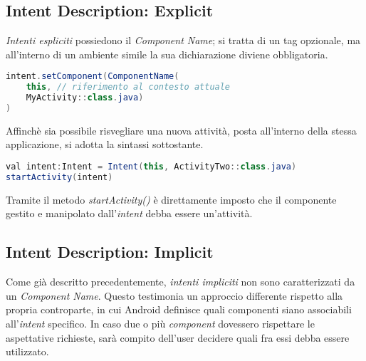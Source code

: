 \documentclass{article}
\begin{document}
\subsection*{Intent Description: Explicit}
\textit{Intenti espliciti} possiedono il \textit{Component Name}; si tratta di un tag opzionale, ma all'interno di un ambiente simile la sua dichiarazione diviene obbligatoria.
\begin{lstlisting}[language=JAVA, title=Inizializzazione di un intent]
intent.setComponent(ComponentName(
    this, // riferimento al contesto attuale
    MyActivity::class.java)
)
\end{lstlisting}
Affinchè sia possibile risvegliare una nuova attività, posta all'interno della stessa applicazione, si adotta la sintassi sottostante.
\begin{lstlisting}[language=JAVA, title=Start di una nuova activity]
val intent:Intent = Intent(this, ActivityTwo::class.java)
startActivity(intent)
\end{lstlisting}    
Tramite il metodo \textit{startActivity()} è direttamente imposto che il componente gestito e manipolato dall'\textit{intent} debba essere un'attività.

\subsection*{Intent Description: Implicit}
Come già descritto precedentemente, \textit{intenti impliciti} non sono caratterizzati da un \textit{Component Name}. Questo testimonia un approccio differente rispetto alla propria controparte, in cui Android definisce quali componenti siano associabili all'\textit{intent} specifico. In caso due o più \textit{component} dovessero rispettare le aspettative richieste, sarà compito dell'user decidere quali fra essi debba essere utilizzato.
\end{document}
